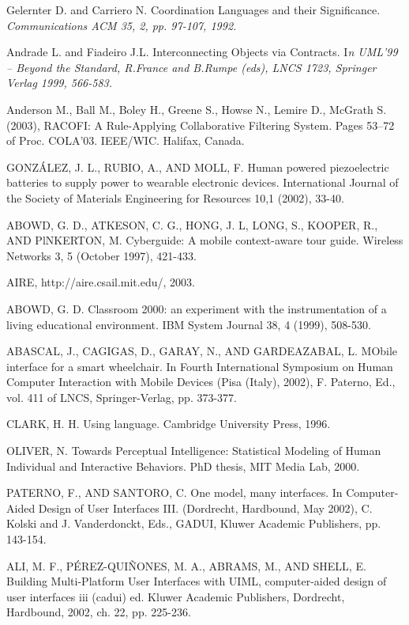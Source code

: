 \begin{thebibliography}{1}
Gelernter D. and Carriero N. {Coordination Languages and
their Significance}.\textit{ Communications ACM 35, 2, pp. 97-107, 1992.}



Andrade L. and Fiadeiro J.L. {Interconnecting Objects via Contracts.} 
I\textit{n UML'99 – Beyond the Standard,
R.France and B.Rumpe (eds), LNCS 1723, Springer Verlag 1999, 566-583.}

\bibitem{} 
Anderson M., Ball M., Boley H., Greene S., Howse N., Lemire D., McGrath S.
(2003), RACOFI: A Rule-Applying Collaborative Filtering System. Pages 53–72
of Proc. COLA’03. IEEE/WIC. Halifax, Canada.

GONZÁLEZ, J. L., RUBIO, A., AND MOLL, F. Human powered piezoelectric batteries
to supply power to wearable electronic devices. International Journal of
the Society of Materials Engineering for Resources 10,1 (2002), 33-40.


ABOWD, G. D., ATKESON, C. G., HONG, J. L, LONG, S., KOOPER,
R., AND PlNKERTON, M. Cyberguide: A mobile context-aware tour guide.
Wireless Networks 3, 5 (October 1997), 421-433.

AIRE, http://aire.csail.mit.edu/, 2003.

ABOWD, G. D. Classroom 2000: an experiment with the instrumentation
of a living educational environment. IBM System Journal 38, 4 (1999),
508-530.

ABASCAL, J., CAGIGAS, D., GARAY, N., AND GARDEAZABAL, L. MObile
interface for a smart wheelchair. In Fourth International Symposium
on Human Computer Interaction with Mobile Devices (Pisa (Italy), 2002),
F. Paterno, Ed., vol. 411 of LNCS, Springer-Verlag, pp. 373-377.

CLARK, H. H. Using language. Cambridge University Press, 1996.


OLIVER, N. Towards Perceptual Intelligence: Statistical Modeling of Human
Individual and Interactive Behaviors. PhD thesis, MIT Media Lab, 2000.

PATERNO, F., AND SANTORO, C. One model, many interfaces. In
Computer-Aided Design of User Interfaces III. (Dordrecht, Hardbound, May
2002), C. Kolski and J. Vanderdonckt, Eds., GADUI, Kluwer Academic Publishers,
pp. 143-154.


ALI, M. F., PÉREZ-QUIÑONES, M. A., ABRAMS, M., AND SHELL, E.
Building Multi-Platform User Interfaces with UIML, computer-aided design
of user interfaces iii (cadui) ed. Kluwer Academic Publishers, Dordrecht,
Hardbound, 2002, ch. 22, pp. 225-236.


\end{thebibliography}
